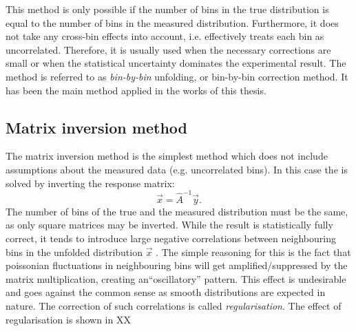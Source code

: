 This method is only possible if the number of bins in the true distribution is equal to the number of bins in the measured distribution.
Furthermore, it does not take any cross-bin effects into account, i.e. effectively treats each bin as uncorrelated.
Therefore, it is usually used when the necessary corrections are small or when the statistical uncertainty dominates the experimental result.
The method is referred to as \textit{bin-by-bin} unfolding, or bin-by-bin correction method.
It has been the main method applied in the works of this thesis.

\subsection{Matrix inversion method}
The matrix inversion method is the simplest method which does not include assumptions about the measured data (e.g. uncorrelated bins).
In this case the  is solved by inverting the response matrix:
\begin{equation}
    \vec{x} = \hat{A}^{-1}\vec{y}.
\end{equation}
The number of bins of the true and the measured distribution must be the same, as only square matrices may be inverted.
While the result is statistically fully correct, it tends to introduce large negative correlations between neighbouring bins in the unfolded distribution $\vec{x}$ \cite{Schmitt:2016orm}.
The simple reasoning for this is the fact that poissonian fluctuations in neighbouring bins will get amplified/suppressed by the matrix multiplication, creating an``oscillatory'' pattern.
This effect is undesirable and goes against the common sense as smooth distributions are expected in nature.
The correction of such correlations is called \textit{regularisation}.
The effect of regularisation is shown in XX

